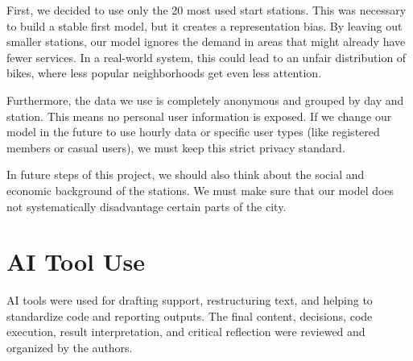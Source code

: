 \documentclass[conference]{IEEEtran}
\begin{document}
First, we decided to use only the 20 most used start stations. This was necessary to build a stable first model, but it creates a representation bias. By leaving out smaller stations, our model ignores the demand in areas that might already have fewer services. In a real-world system, this could lead to an unfair distribution of bikes, where less popular neighborhoods get even less attention.

Furthermore, the data we use is completely anonymous and grouped by day and station. This means no personal user information is exposed. If we change our model in the future to use hourly data or specific user types (like registered members or casual users), we must keep this strict privacy standard. 

In future steps of this project, we should also think about the social and economic background of the stations. We must make sure that our model does not systematically disadvantage certain parts of the city.

\section{AI Tool Use}
AI tools were used for drafting support, restructuring text, and helping to standardize code and reporting outputs. The final content, decisions, code execution, result interpretation, and critical reflection were reviewed and organized by the authors.
\end{document}
